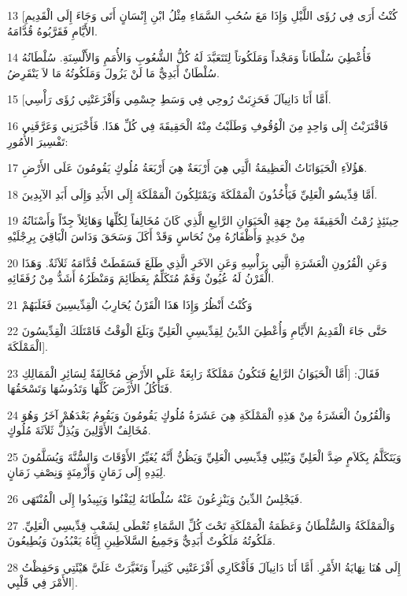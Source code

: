 \par 13 [كُنْتُ أَرَى فِي رُؤَى اللَّيْلِ وَإِذَا مَعَ سُحُبِ السَّمَاءِ مِثْلُ ابْنِ إِنْسَانٍ أَتَى وَجَاءَ إِلَى الْقَدِيمِ الأَيَّامِ فَقَرَّبُوهُ قُدَّامَهُ.
\par 14 فَأُعْطِيَ سُلْطَاناً وَمَجْداً وَمَلَكُوتاً لِتَتَعَبَّدَ لَهُ كُلُّ الشُّعُوبِ وَالأُمَمِ وَالأَلْسِنَةِ. سُلْطَانُهُ سُلْطَانٌ أَبَدِيٌّ مَا لَنْ يَزُولَ وَمَلَكُوتُهُ مَا لاَ يَنْقَرِضُ.
\par 15 [أَمَّا أَنَا دَانِيآلَ فَحَزِنَتْ رُوحِي فِي وَسَطِ جِسْمِي وَأَفْزَعَتْنِي رُؤَى رَأْسِي.
\par 16 فَاقْتَرَبْتُ إِلَى وَاحِدٍ مِنَ الْوُقُوفِ وَطَلَبْتُ مِنْهُ الْحَقِيقَةَ فِي كُلِّ هَذَا. فَأَخْبَرَنِي وَعَرَّفَنِي تَفْسِيرَ الأُمُورِ:
\par 17 هَؤُلاَءِ الْحَيَوَانَاتُ الْعَظِيمَةُ الَّتِي هِيَ أَرْبَعَةٌ هِيَ أَرْبَعَةُ مُلُوكٍ يَقُومُونَ عَلَى الأَرْضِ.
\par 18 أَمَّا قِدِّيسُو الْعَلِيِّ فَيَأْخُذُونَ الْمَمْلَكَةَ وَيَمْتَلِكُونَ الْمَمْلَكَةَ إِلَى الأَبَدِ وَإِلَى أَبَدِ الآبِدِينَ.
\par 19 حِينَئِذٍ رُمْتُ الْحَقِيقَةَ مِنْ جِهَةِ الْحَيَوَانِ الرَّابِعِ الَّذِي كَانَ مُخَالِفاً لِكُلِّهَا وَهَائِلاً جِدّاً وَأَسْنَانُهُ مِنْ حَدِيدٍ وَأَظْفَارُهُ مِنْ نُحَاسٍ وَقَدْ أَكَلَ وَسَحَقَ وَدَاسَ الْبَاقِيَ بِرِجْلَيْهِ
\par 20 وَعَنِ الْقُرُونِ الْعَشَرَةِ الَّتِي بِرَأْسِهِ وَعَنِ الآخَرِ الَّذِي طَلَعَ فَسَقَطَتْ قُدَّامَهُ ثَلاَثَةٌ. وَهَذَا الْقَرْنُ لَهُ عُيُونٌ وَفَمٌ مُتَكَلِّمٌ بِعَظَائِمَ وَمَنْظَرُهُ أَشَدُّ مِنْ رُفَقَائِهِ.
\par 21 وَكُنْتُ أَنْظُرُ وَإِذَا هَذَا الْقَرْنُ يُحَارِبُ الْقِدِّيسِينَ فَغَلَبَهُمْ
\par 22 حَتَّى جَاءَ الْقَدِيمُ الأَيَّامِ وَأُعْطِيَ الدِّينُ لِقِدِّيسِيِ الْعَلِيِّ وَبَلَغَ الْوَقْتُ فَامْتَلَكَ الْقِدِّيسُونَ الْمَمْلَكَةَ].
\par 23 فَقَالَ: [أَمَّا الْحَيَوَانُ الرَّابِعُ فَتَكُونُ مَمْلَكَةٌ رَابِعَةٌ عَلَى الأَرْضِ مُخَالِفَةٌ لِسَائِرِ الْمَمَالِكِ فَتَأْكُلُ الأَرْضَ كُلَّهَا وَتَدُوسُهَا وَتَسْحَقُهَا.
\par 24 وَالْقُرُونُ الْعَشَرَةُ مِنْ هَذِهِ الْمَمْلَكَةِ هِيَ عَشَرَةُ مُلُوكٍ يَقُومُونَ وَيَقُومُ بَعْدَهُمْ آخَرُ وَهُوَ مُخَالِفٌ الأَوَّلِينَ وَيُذِلُّ ثَلاَثَةَ مُلُوكٍ.
\par 25 وَيَتَكَلَّمُ بِكَلاَمٍ ضِدَّ الْعَلِيِّ وَيُبْلِي قِدِّيسِي الْعَلِيِّ وَيَظُنُّ أَنَّهُ يُغَيِّرُ الأَوْقَاتَ وَالسُّنَّةَ وَيُسَلَّمُونَ لِيَدِهِ إِلَى زَمَانٍ وَأَزْمِنَةٍ وَنِصْفِ زَمَانٍ.
\par 26 فَيَجْلِسُ الدِّينُ وَيَنْزِعُونَ عَنْهُ سُلْطَانَهُ لِيَفْنُوا وَيَبِيدُوا إِلَى الْمُنْتَهَى.
\par 27 وَالْمَمْلَكَةُ وَالسُّلْطَانُ وَعَظَمَةُ الْمَمْلَكَةِ تَحْتَ كُلِّ السَّمَاءِ تُعْطَى لِشَعْبِ قِدِّيسِي الْعَلِيِّ. مَلَكُوتُهُ مَلَكُوتٌ أَبَدِيٌّ وَجَمِيعُ السَّلاَطِينِ إِيَّاهُ يَعْبُدُونَ وَيُطِيعُونَ.
\par 28 إِلَى هُنَا نِهَايَةُ الأَمْرِ. أَمَّا أَنَا دَانِيآلَ فَأَفْكَارِي أَفْزَعَتْنِي كَثِيراً وَتَغَيَّرَتْ عَلَيَّ هَيْئَتِي وَحَفِظْتُ الأَمْرَ فِي قَلْبِي].

